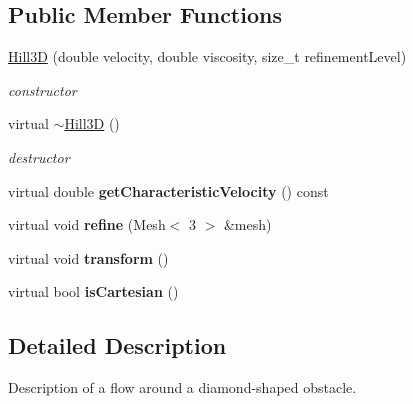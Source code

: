 \subsection*{Public Member Functions}
\begin{DoxyCompactItemize}
\item 
\hyperlink{classnatrium_1_1Hill3D_a3972f24e6e178a1a7aacf6561c5ac119}{Hill3D} (double velocity, double viscosity, size\_\-t refinementLevel)
\begin{DoxyCompactList}\small\item\em constructor \item\end{DoxyCompactList}\item 
\hypertarget{classnatrium_1_1Hill3D_ae76da28f7d23a057b216a92681fc2fb5}{
virtual \hyperlink{classnatrium_1_1Hill3D_ae76da28f7d23a057b216a92681fc2fb5}{$\sim$Hill3D} ()}
\label{classnatrium_1_1Hill3D_ae76da28f7d23a057b216a92681fc2fb5}

\begin{DoxyCompactList}\small\item\em destructor \item\end{DoxyCompactList}\item 
\hypertarget{classnatrium_1_1Hill3D_abc17d07261926052b3197800b3b64461}{
virtual double {\bfseries getCharacteristicVelocity} () const }
\label{classnatrium_1_1Hill3D_abc17d07261926052b3197800b3b64461}

\item 
\hypertarget{classnatrium_1_1Hill3D_a1b5f79484ea6ce7f2a02e50bc146a420}{
virtual void {\bfseries refine} (Mesh$<$ 3 $>$ \&mesh)}
\label{classnatrium_1_1Hill3D_a1b5f79484ea6ce7f2a02e50bc146a420}

\item 
\hypertarget{classnatrium_1_1Hill3D_aaf0b795b00974c783a72648dc878865c}{
virtual void {\bfseries transform} ()}
\label{classnatrium_1_1Hill3D_aaf0b795b00974c783a72648dc878865c}

\item 
\hypertarget{classnatrium_1_1Hill3D_ab30e0233ec0ed6e0765cf279f5f0a579}{
virtual bool {\bfseries isCartesian} ()}
\label{classnatrium_1_1Hill3D_ab30e0233ec0ed6e0765cf279f5f0a579}

\end{DoxyCompactItemize}


\subsection{Detailed Description}
Description of a flow around a diamond-\/shaped obstacle. 

